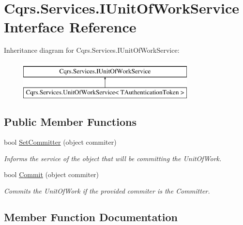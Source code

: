 \hypertarget{interfaceCqrs_1_1Services_1_1IUnitOfWorkService}{}\section{Cqrs.\+Services.\+I\+Unit\+Of\+Work\+Service Interface Reference}
\label{interfaceCqrs_1_1Services_1_1IUnitOfWorkService}
Inheritance diagram for Cqrs.\+Services.\+I\+Unit\+Of\+Work\+Service\+:\begin{figure}[H]
\begin{center}
\leavevmode
\includegraphics[height=2.000000cm]{interfaceCqrs_1_1Services_1_1IUnitOfWorkService}
\end{center}
\end{figure}
\subsection*{Public Member Functions}
\begin{DoxyCompactItemize}
\item 
bool \hyperlink{interfaceCqrs_1_1Services_1_1IUnitOfWorkService_a54f241cd90bbebf9cc73d5a296ed593b}{Set\+Committer} (object commiter)
\begin{DoxyCompactList}\small\item\em Informs the service of the object that will be committing the Unit\+Of\+Work. \end{DoxyCompactList}\item 
bool \hyperlink{interfaceCqrs_1_1Services_1_1IUnitOfWorkService_a3bd8a6a931fc6f457d136d979d26cead}{Commit} (object commiter)
\begin{DoxyCompactList}\small\item\em Commits the Unit\+Of\+Work if the provided {\itshape commiter}  is the Committer. \end{DoxyCompactList}\end{DoxyCompactItemize}


\subsection{Member Function Documentation}
\mbox{\label{interfaceCqrs_1_1Services_1_1IUnitOfWorkService_a3bd8a6a931fc6f457d136d979d26cead}} 
